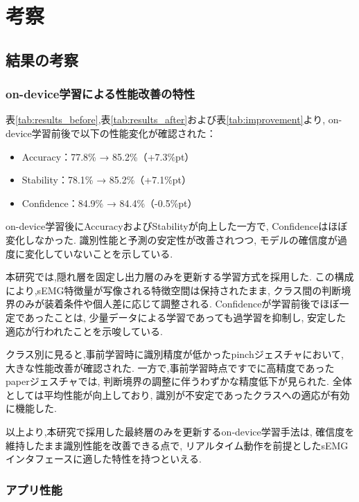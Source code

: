 \chapter{考察}

\section{結果の考察}

\subsection{on-device学習による性能改善の特性}

表\ref{tab:results_before},表\ref{tab:results_after}および表\ref{tab:improvement}より,
on-device学習前後で以下の性能変化が確認された：

\begin{itemize}
    \item Accuracy：77.8\% → 85.2\%（+7.3\%pt）
    \item Stability：78.1\% → 85.2\%（+7.1\%pt）
    \item Confidence：84.9\% → 84.4\%（-0.5\%pt）
\end{itemize}

on-device学習後にAccuracyおよびStabilityが向上した一方で,
Confidenceはほぼ変化しなかった.
識別性能と予測の安定性が改善されつつ,
モデルの確信度が過度に変化していないことを示している.

本研究では,隠れ層を固定し出力層のみを更新する学習方式を採用した.
この構成により,sEMG特徴量が写像される特徴空間は保持されたまま,
クラス間の判断境界のみが装着条件や個人差に応じて調整される.
Confidenceが学習前後でほぼ一定であったことは,
少量データによる学習であっても過学習を抑制し,
安定した適応が行われたことを示唆している.

クラス別に見ると,事前学習時に識別精度が低かったpinchジェスチャにおいて,
大きな性能改善が確認された.
一方で,事前学習時点ですでに高精度であったpaperジェスチャでは,
判断境界の調整に伴うわずかな精度低下が見られた.
全体としては平均性能が向上しており,
識別が不安定であったクラスへの適応が有効に機能した.

以上より,本研究で採用した最終層のみを更新するon-device学習手法は,
確信度を維持したまま識別性能を改善できる点で,
リアルタイム動作を前提としたsEMGインタフェースに適した特性を持つといえる.
\pagebreak

\subsection{アプリ性能}

